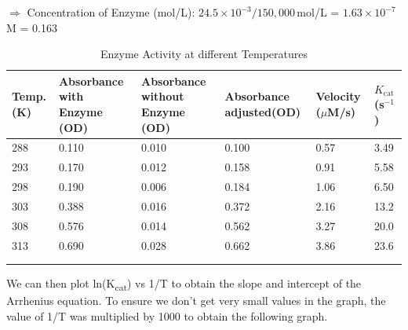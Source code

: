 \documentclass[pdflatex,sn-mathphys]{sn-jnl}%
\theoremstyle{thmstyleone}%
\theoremstyle{thmstyletwo}%
\theoremstyle{thmstylethree}%
\begin{document}
$\Rightarrow$ Concentration of Enzyme (mol/L): $24.5 \times 10^{-3}/150,000$\,mol/L = $1.63 \times 10^{-7}$\,M = 0.163\,\mu{}
\begin{table}[h]
  \begin{center}
    \begin{minipage}{300pt}
      \caption{Enzyme Activity at different Temperatures}\label{tab1}
      \begin{tabular}{  m{4em}  m{4em} m{4.5em}  m{4.5em}  m{4.5em} m{4.5em}}
        \toprule
        Temp. (K) & Absorbance with Enzyme (OD) & Absorbance without Enzyme (OD) & Absorbance adjusted\footnotemark[1] (OD) & Velocity ($\mu$M/s) & $K_{\text{cat}}$ (s$^{-1}$) \\
        \midrule
        288       & 0.110                       & 0.010                          & 0.100                                    & 0.57                & 3.49                        \\
        293       & 0.170                       & 0.012                          & 0.158                                    & 0.91                & 5.58                        \\
        298       & 0.190                       & 0.006                          & 0.184                                    & 1.06                & 6.50                        \\
        303       & 0.388                       & 0.016                          & 0.372                                    & 2.16                & 13.2                        \\
        308       & 0.576                       & 0.014                          & 0.562                                    & 3.27                & 20.0                        \\
        313       & 0.690                       & 0.028                          & 0.662                                    & 3.86                & 23.6                        \\\\
        \botrule
      \end{tabular}
    \end{minipage}
  \end{center}
\end{table}

We can then plot ln(K\textsubscript{cat}) vs 1/T to obtain the slope and
intercept of the Arrhenius equation. To ensure we don't get very small values
in the graph, the value of 1/T was multiplied by 1000 to obtain the following
graph.
\end{document}
